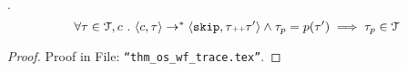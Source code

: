 %
%
\begin{thm}.
\label{thm:os_wf_trace}
\\
\[
\forall \mathtt{\tau} \in \mathcal{T}, c ~.~
\langle c, \mathtt{\tau} \rangle \to^{*} \langle \mathtt{skip}, \mathtt{\tau} {\scriptscriptstyle ++} \mathtt{\tau}' \rangle \land \mathtt{\tau}_p = p(\mathtt{\tau}')
\implies
\mathtt{\tau}_p\in \mathcal{T}
\] 
%
\end{thm}
\begin{proof}
Proof in File: {\tt ``thm\_os\_wf\_trace.tex''}.
% 
\end{proof}
%
%
%
%
%

%
%
%
%
%
%
%
% 
%
\clearpage
